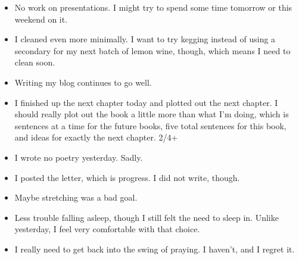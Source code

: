 \documentclass[12pt]{article}[titlepage]
\newcommand{\1}{\={a}}
\newcommand{\2}{\={e}}
\newcommand{\3}{\={\i}}
\newcommand{\4}{\=o}
\newcommand{\5}{\=u}
\newcommand{\6}{\={A}}
\renewcommand{\,}{\textsuperscript{,}}
\begin{document}
\begin{itemize}
\item No work on presentations. I might try to spend some time tomorrow or this weekend on it.
\item I cleaned even more minimally.
I want to try kegging instead of using a secondary for my next batch of lemon wine, though, which means I need to clean soon.
\item Writing my blog continues to go well.
\item I finished up the next chapter today and plotted out the next chapter.
I should really plot out the book a little more than what I'm doing, which is sentences at a time for the future books, five total sentences for this book, and ideas for exactly the next chapter. 2/4+
\item I wrote no poetry yesterday. Sadly.
\item I posted the letter, which is progress. I did not write, though.
\item Maybe stretching was a bad goal.
\item Less trouble falling asleep, though I still felt the need to sleep in.
Unlike yesterday, I feel very comfortable with that choice.
\item I really need to get back into the swing of praying.
I haven't, and I regret it.
\end{itemize}
\end{document}
